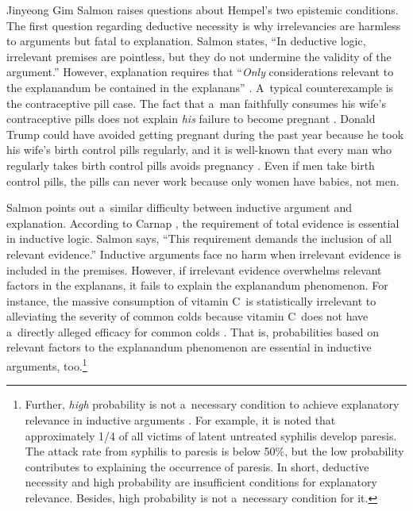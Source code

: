 \begin{artengenv}{Jinyeong Gim}
Salmon raises questions about Hempel's two epistemic conditions. The first question regarding deductive necessity is why irrelevancies are harmless to arguments but fatal to explanation. Salmon
\parencite*[][p.93]{salmon_scientific_1984} %
 states, ``In deductive logic, irrelevant premises are pointless, but they do not undermine the validity of the argument.'' However, explanation requires that ``\textit{Only} considerations relevant to the explanandum be contained in the explanans'' 
\parencite[][p.94, an emphasis original]{salmon_scientific_1984}. %
 A~typical counterexample is the contraceptive pill case. The fact that a~man faithfully consumes his wife's contraceptive pills does not explain \textit{his} failure to become pregnant 
\parencite[][p.50]{salmon_four_1989}. %
 Donald Trump could have avoided getting pregnant during the past year because he took his wife's birth control pills regularly, and it is well-known that every man who regularly takes birth control pills avoids pregnancy 
\parencite[][p.34]{salmon_statistical_1971}. %
 Even if men take birth control pills, the pills can never work because only women have babies, not men.

Salmon points out a~similar difficulty between inductive argument and explanation. According to Carnap
\parencite*[][sec.45B]{carnap_logical_1950}, %
 the requirement of total evidence is essential in inductive logic. Salmon 
\parencite*[][p.93]{salmon_scientific_1984} %
 says, ``This requirement demands the inclusion of all relevant evidence.'' Inductive arguments face no harm when irrelevant evidence is included in the premises. However, if irrelevant evidence overwhelms relevant factors in the explanans, it fails to explain the explanandum phenomenon. For instance, the massive consumption of vitamin C~is statistically irrelevant to alleviating the severity of common colds because vitamin C~does not have a~directly alleged efficacy for common colds 
\parencites[][p.94]{salmon_scientific_1984}[][p.58]{salmon_four_1989}. %
 That is, probabilities based on relevant factors to the explanandum phenomenon are essential in inductive arguments, too.\footnote{Further, \textit{high} probability is not a~necessary condition to achieve explanatory relevance in inductive arguments 
\parencite[][p.49]{salmon_four_1989}. %
 For example, it is noted that approximately 1/4 of all victims of latent untreated syphilis develop paresis. The attack rate from syphilis to paresis is below 50\%, but the low probability contributes to explaining the occurrence of paresis. In short, deductive necessity and high probability are insufficient conditions for explanatory relevance. Besides, high probability is not a~necessary condition for it.}


\end{artengenv}

